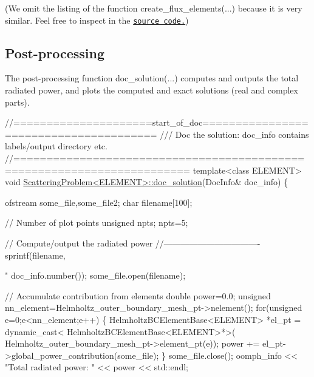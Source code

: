 (We omit the listing of the function {\ttfamily create\+\_\+flux\+\_\+elements}(...) because it is very similar. Feel free to inspect in the \href{../../../../demo_drivers/helmholtz/scattering/scattering.cc}{\tt source code.})



 

\hypertarget{index_doc}{}\subsection{Post-\/processing}\label{index_doc}
The post-\/processing function {\ttfamily doc\+\_\+solution}(...) computes and outputs the total radiated power, and plots the computed and exact solutions (real and complex parts).

 
\begin{DoxyCodeInclude}
\textcolor{comment}{//=====================start\_of\_doc=======================================}
\textcolor{comment}{/// Doc the solution: doc\_info contains labels/output directory etc.}
\textcolor{comment}{}\textcolor{comment}{//========================================================================}
\textcolor{keyword}{template}<\textcolor{keyword}{class} ELEMENT>
\textcolor{keywordtype}{void} \hyperlink{classScatteringProblem_af83ab14c4f4750ea17c21466f6c6364f}{ScatteringProblem<ELEMENT>::doc\_solution}(DocInfo& 
                                              doc\_info) 
\{ 

 ofstream some\_file,some\_file2;
 \textcolor{keywordtype}{char} filename[100];
 
 \textcolor{comment}{// Number of plot points}
 \textcolor{keywordtype}{unsigned} npts;
 npts=5; 

 \textcolor{comment}{// Compute/output the radiated power}
 \textcolor{comment}{//----------------------------------}
 sprintf(filename,\textcolor{stringliteral}{"%
         doc\_info.number());
 some\_file.open(filename);

 \textcolor{comment}{// Accumulate contribution from elements}
 \textcolor{keywordtype}{double} power=0.0;
 \textcolor{keywordtype}{unsigned} nn\_element=Helmholtz\_outer\_boundary\_mesh\_pt->nelement(); 
 \textcolor{keywordflow}{for}(\textcolor{keywordtype}{unsigned} e=0;e<nn\_element;e++)
  \{
   HelmholtzBCElementBase<ELEMENT> *el\_pt = 
    \textcolor{keyword}{dynamic\_cast<} HelmholtzBCElementBase<ELEMENT>*\textcolor{keyword}{>}(
     Helmholtz\_outer\_boundary\_mesh\_pt->element\_pt(e)); 
   power += el\_pt->global\_power\_contribution(some\_file);
  \}
 some\_file.close();
 oomph\_info << \textcolor{stringliteral}{"Total radiated power: "} << power << std::endl; 

}
\end{DoxyCodeInclude}
